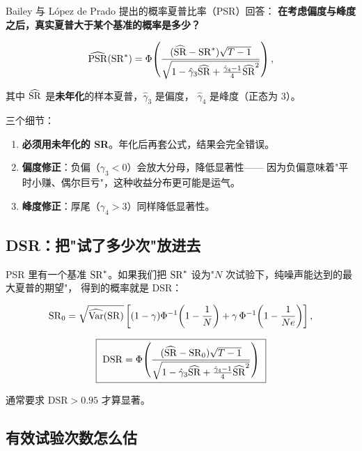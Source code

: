 Bailey 与 López de Prado 提出的概率夏普比率（PSR）回答：
\textbf{在考虑偏度与峰度之后，真实夏普大于某个基准的概率是多少？}

\begin{equation}
  \widehat{\mathrm{PSR}}(\mathrm{SR}^*) = \Phi\!\left(
  \frac{(\widehat{\mathrm{SR}} - \mathrm{SR}^*)\sqrt{T-1}}
  {\sqrt{1 - \hat\gamma_3\widehat{\mathrm{SR}} + \frac{\hat\gamma_4-1}{4}\widehat{\mathrm{SR}}^2}}
  \right),
  \label{eq:psr}
\end{equation}

其中 $\widehat{\mathrm{SR}}$ 是\textbf{未年化}的样本夏普，$\hat\gamma_3$ 是偏度，
$\hat\gamma_4$ 是峰度（正态为 3）。

三个细节：

\begin{enumerate}
  \item \textbf{必须用未年化的 SR}。年化后再套公式，结果会完全错误。
  \item \textbf{偏度修正}：负偏（$\gamma_3<0$）会放大分母，降低显著性——
        因为负偏意味着"平时小赚、偶尔巨亏"，这种收益分布更可能是运气。
  \item \textbf{峰度修正}：厚尾（$\gamma_4>3$）同样降低显著性。
\end{enumerate}

\subsection{DSR：把"试了多少次"放进去}

PSR 里有一个基准 $\mathrm{SR}^*$。如果我们把 $\mathrm{SR}^*$ 设为"$N$ 次试验下，纯噪声能达到的最大夏普的期望"，
得到的概率就是 DSR：

\begin{equation}
  \mathrm{SR}_0 = \sqrt{\widehat{\mathrm{Var}}(\mathrm{SR})}\left[
  (1-\gamma)\Phi^{-1}\!\left(1-\frac1N\right)
  + \gamma\,\Phi^{-1}\!\left(1-\frac{1}{Ne}\right)\right],
  \label{eq:sr0}
\end{equation}

\begin{equation}
  \boxed{\ \mathrm{DSR} = \Phi\!\left(
  \frac{(\widehat{\mathrm{SR}} - \mathrm{SR}_0)\sqrt{T-1}}
  {\sqrt{1 - \hat\gamma_3\widehat{\mathrm{SR}} + \frac{\hat\gamma_4-1}{4}\widehat{\mathrm{SR}}^2}}
  \right)\ }
  \label{eq:dsr}
\end{equation}

通常要求 $\mathrm{DSR} > 0.95$ 才算显著。

\subsection{有效试验次数怎么估}

